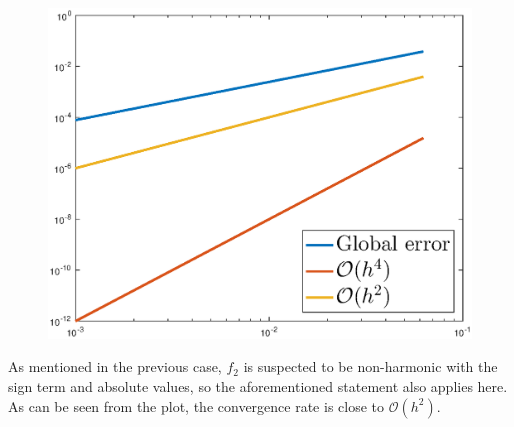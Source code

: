 \documentclass[main.tex]{subfiles}
\begin{document}
\begin{figure}[h]
\begin{minipage}{.3\textwidth}
  \includegraphics[width=.9\linewidth]{../Figures/ex2u2err}
  \label{fig:ex2:u2err}
\end{minipage}
\end{figure}

As mentioned in the previous case, $f_2$ is suspected to be non-harmonic with the sign term and absolute values, so the aforementioned statement also applies here. As can be seen from the plot, the convergence rate is close to $\mathcal{O}(h^2)$.
\end{document}
